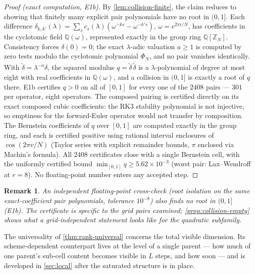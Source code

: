 \documentclass[pdflatex,sn-mathphys-num]{sn-jnl}%
\theoremstyle{thmstyleone}%
\theoremstyle{thmstyletwo}%
\newtheorem{remark}{Remark}%
\theoremstyle{thmstylethree}%
\begin{document}
\begin{proof}[Proof (exact computation, E1b)]
By \cref{lem:collision-finite}, the claim reduces to showing that finitely many explicit pair polynomials have no root in $(0,1]$.
Each difference $\delta_{k,k'}(\lambda)=\sum_sc_s(\lambda)(\omega^{-ks}-\omega^{-k's})$, $\omega=e^{2\pi i/N}$, has coefficients in the cyclotomic field $\mathbb Q(\omega)$, represented exactly in the group ring $\mathbb Q[\mathbb Z_N]$.
Consistency forces $\delta(0)=0$; the exact $\lambda$-adic valuation $a\ge1$ is computed by zero tests modulo the cyclotomic polynomial $\Phi_N$, and no pair vanishes identically.
With $\tilde\delta=\lambda^{-a}\delta$, the squared modulus $q=\tilde\delta\,\overline{\tilde\delta}$ is a $\lambda$-polynomial of degree at most eight with real coefficients in $\mathbb Q(\omega)$, and a collision in $(0,1]$ is exactly a root of $q$ there.
E1b certifies $q>0$ on all of $[0,1]$ for every one of the $2408$ pairs --- $301$ per operator, eight operators.
The composed pairing is certified directly on its exact composed cubic coefficients: the RK3 stability polynomial is not injective, so emptiness for the forward-Euler operator would not transfer by composition.
The Bernstein coefficients of $q$ over $[0,1]$ are computed exactly in the group ring, and each is certified positive using rational interval enclosures of $\cos(2\pi v/N)$ (Taylor series with explicit remainder bounds, $\pi$ enclosed via Machin's formula).
All $2408$ certificates close with a single Bernstein cell, with the uniformly certified bound $\min_{[0,1]}q\ge5.62\times10^{-3}$ (worst pair: Lax--Wendroff at $r=8$).
No floating-point number enters any accepted step.
\end{proof}

\begin{remark}
An independent floating-point cross-check (root isolation on the same exact-coefficient pair polynomials, tolerance $10^{-8}$) also finds no root in $(0,1]$ (E1b).
The certificate is specific to the grid pairs examined; \cref{prop:collision-empty} shows what a grid-independent statement looks like for the quadratic subfamily.
\end{remark}

The universality of \cref{thm:rank-universal} concerns the total visible dimension.
Its scheme-dependent counterpart lives at the level of a single parent --- how much of one parent's sub-cell content becomes visible in $L$ steps, and how soon --- and is developed in \cref{sec:local} after the saturated structure is in place.
\end{document}
